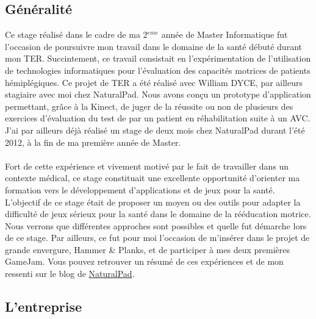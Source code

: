\subsection{Généralité}	
Ce stage réalisé dans le cadre de ma 2$^{eme}$ année de Master Informatique fut l'occasion de poursuivre mon travail dans le domaine de la santé débuté durant mon TER. Succintement, ce travail consistait en l'expérimentation de l'utilisation de technologies informatiques pour l'évaluation des capacités motrices de patients hémiplégiques. Ce projet de TER a été réalisé avec William DYCE, par ailleurs stagiaire avec moi chez NaturalPad. Nous avons conçu un prototype d'application permettant, grâce à la Kinect, de juger de la réussite ou non de plusieurs des exercices d'évaluation du test de %
par un patient en réhabilitation suite à un AVC. J'ai par ailleurs déjà réalisé un stage de deux mois chez NaturalPad durant l'été 2012, à la fin de ma première année de Master.
\paragraph{}
Fort de cette expérience et vivement motivé par le fait de travailler dans un contexte médical, ce stage constituait une excellente opportunité d'orienter ma formation vers le développement d'applications et de jeux pour la santé.\\
L'objectif de ce stage était de proposer un moyen ou des outils pour adapter la difficulté de jeux sérieux pour la santé dans le domaine de la rééducation motrice. Nous verrons que différentes approches sont possibles et quelle fut démarche lors de ce stage. Par ailleurs, ce fut pour moi l'occasion de m'insérer dans le projet de grande envergure, Hammer \& Planks, et de participer à mes deux premières GameJam. Vous pouvez retrouver un résumé de ces expériences et de mon ressenti sur le blog de \href{http://naturalpad.fr/la-game-jam-chez-naturalpad/}{NaturalPad}.

\subsection{L'entreprise}
